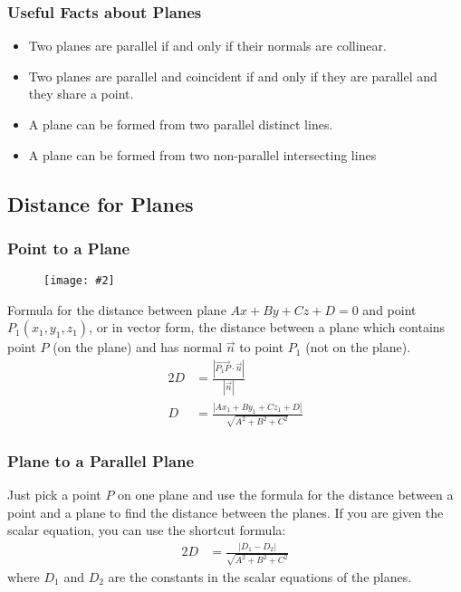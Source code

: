 \documentclass{report}
\newcommand\pv[1]{\overrightarrow{#1}}
\newcommand{\diagram}[2][0.5]{
	\begin{figure}[H]
		\centering
		\texttt{[image: \#2]}
	\end{figure}
	}
\theoremstyle{definition}
\numberwithin{equation}{section}
\begin{document}
\subsubsection{Useful Facts about Planes}
\begin{itemize}
	\item Two planes are parallel if and only if their normals are collinear.
	\item Two planes are parallel and coincident if and only if they are parallel and they share a point.
	\item A plane can be formed from two parallel distinct lines.
	\item A plane can be formed from two non-parallel intersecting lines
\end{itemize}


\subsection{Distance for Planes}

\subsubsection{Point to a Plane}
\diagram{distance-from-point-to-plane}
Formula for the distance between plane $Ax+By+Cz+D=0$ and point $P_1 (x_1,y_1,z_1)$, or in vector form, the distance between a plane which contains point $P$ (on the plane) and has normal $\vec n$ to point $P_1$ (not on the plane).
\begin{alignat}{2}{}
	D &= \frac{|\pv{P_1P}\cdot\vec n|}{|\vec n|} \\
	D &= \frac{|Ax_1+By_1+Cz_1+D|}{\sqrt{A^2+B^2+C^2}}
\end{alignat}

\subsubsection{Plane to a Parallel Plane}
Just pick a point $P$ on one plane and use the formula for the distance between a point and a plane to find the distance between the planes. If you are given the scalar equation, you can use the shortcut formula:
\begin{alignat}{2}{}
	D &= \frac{|D_1 - D_2|}{\sqrt{A^2+B^2+C^2}}
\end{alignat}
where $D_1$ and $D_2$ are the constants in the scalar equations of the planes.
\end{document}
